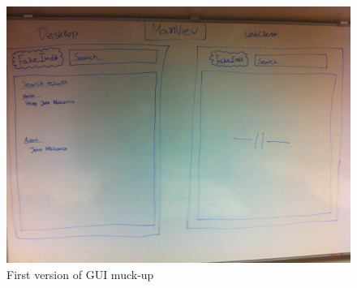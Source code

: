 \begin{figure}
\includegraphics[width=\linewidth]{img/RAD/GUIMuckUp.JPG}
\caption{First version of GUI muck-up}
\label{fig:GUIMuckUp}
\end{figure}
\newpage

